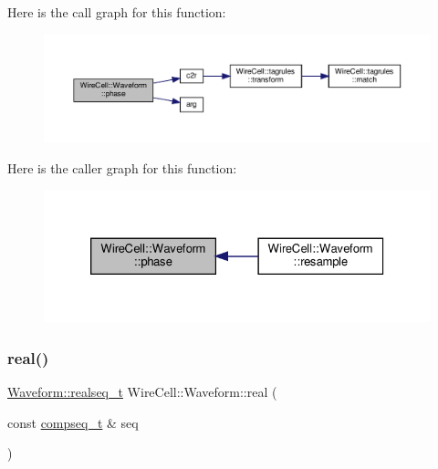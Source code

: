 Here is the call graph for this function\+:
\nopagebreak
\begin{figure}[H]
\begin{center}
\leavevmode
\includegraphics[width=350pt]{namespace_wire_cell_1_1_waveform_abcab023facead1d0eb14e2042ce578bb_cgraph}
\end{center}
\end{figure}
Here is the caller graph for this function\+:
\nopagebreak
\begin{figure}[H]
\begin{center}
\leavevmode
\includegraphics[width=326pt]{namespace_wire_cell_1_1_waveform_abcab023facead1d0eb14e2042ce578bb_icgraph}
\end{center}
\end{figure}
\mbox{\label{namespace_wire_cell_1_1_waveform_a40f3344b248eea24a08d391e8f402bb8}} 
\subsubsection{\texorpdfstring{real()}{real()}}
{\footnotesize\ttfamily \hyperlink{namespace_wire_cell_1_1_waveform_a479175e541c8545e87cd8063b74b6956}{Waveform\+::realseq\+\_\+t} Wire\+Cell\+::\+Waveform\+::real (\begin{DoxyParamCaption}\item[{const \hyperlink{namespace_wire_cell_1_1_waveform_a7e4a8d371f774438bb360e7d1dcb583a}{compseq\+\_\+t} \&}]{seq }\end{DoxyParamCaption})}



